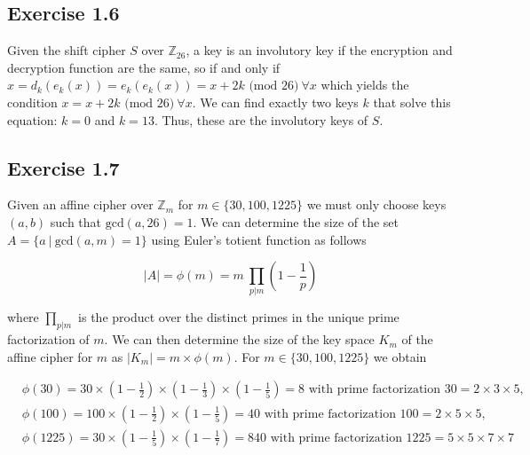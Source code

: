 \documentclass[12pt]{article}
\begin{document}
 


\subsection*{Exercise 1.6}

Given the shift cipher $S$ over $\mathbb{Z}_{26}$, a key is an involutory key if the encryption and decryption function are the same, so if and only if $x = d_k(e_k(x)) = e_k(e_k(x)) = x + 2k \text{ (mod } 26) \ \forall x$ which yields the condition $x = x + 2k \text{ (mod } 26) \ \forall x$. We can find exactly two keys $k$ that solve this equation: $k = 0$ and $k = 13$. Thus, these are the involutory keys of $S$.

\subsection*{Exercise 1.7}

Given an affine cipher over $\mathbb{Z}_m$ for $m \in \{30, 100, 1225\}$ we must only choose keys $(a,b)$ such that $\text{gcd}(a,26) = 1$. We can determine the size of the set $A = \{ a \ | \ \text{gcd}(a,m)=1 \}$ using Euler's totient function as follows

$$
|A| = \phi(m) = m \ \prod_{p|m} \left(1 - \frac{1}{p}\right) 
$$

\noindent where $\prod_{p|m}$ is the product over the distinct primes in the unique prime factorization of $m$. We can then determine the size of the key space $K_m$ of the affine cipher for $m$ as $|K_m| = m \times \phi(m)$. For $m \in \{30, 100, 1225\}$ we obtain

\begin{align*}
& \phi(30) = 30 \times \left(1 - \frac{1}{2}\right) \times \left(1 - \frac{1}{3}\right) \times \left(1 - \frac{1}{5}\right) = 8 \text{ with prime factorization } 30 = 2 \times 3 \times 5,\\
& \phi(100) = 100 \times \left(1 - \frac{1}{2}\right) \times \left(1 - \frac{1}{5}\right) = 40 \text{ with prime factorization } 100 = 2 \times 5 \times 5,\\
& \phi(1225) = 30 \times \left(1 - \frac{1}{5}\right) \times \left(1 - \frac{1}{7}\right) = 840 \text{ with prime factorization } 1225 = 5 \times 5 \times 7 \times 7
\end{align*}
\end{document}
